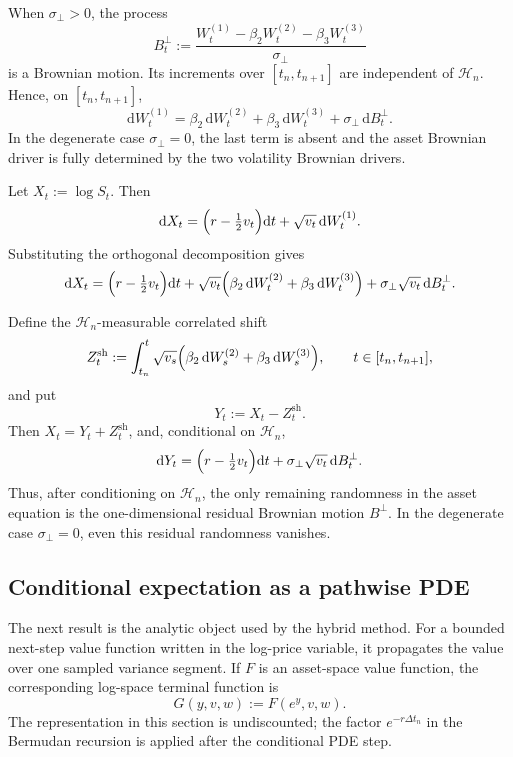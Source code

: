 \documentclass[pdflatex,sn-mathphys-num]{sn-jnl}
\theoremstyle{thmstyleone}%
\theoremstyle{thmstylethree}%
\theoremstyle{thmstyletwo}%
\newcommand{\dd}{\mathrm d}
\begin{document}
When $\sigma_\perp>0$, the process
\[
B_t^\perp
:=
\frac{W_t^{(1)}-\beta_2W_t^{(2)}-\beta_3W_t^{(3)}}{\sigma_\perp}
\]
is a Brownian motion. Its increments over $[t_n,t_{n+1}]$ are independent of
$\mathcal H_n$. Hence, on $[t_n,t_{n+1}]$,
\begin{equation}\label{eq:orth}
\dd W_t^{(1)}
=\beta_2\,\dd W_t^{(2)}
+\beta_3\,\dd W_t^{(3)}
+\sigma_\perp\,\dd B_t^\perp.
\end{equation}
In the degenerate case $\sigma_\perp=0$, the last term is absent and the asset
Brownian driver is fully determined by the two volatility Brownian drivers.

Let $X_t:=\log S_t$. Then
\begin{equation}\label{eq:logS}
\dd X_t
=\Bigl(r-\tfrac12v_t\Bigr)\dd t+\sqrt{v_t}\,\dd W_t^{(1)}.
\end{equation}
Substituting the orthogonal decomposition gives
\[
\dd X_t
=\Bigl(r-\tfrac12v_t\Bigr)\dd t
+\sqrt{v_t}\Bigl(\beta_2\,\dd W_t^{(2)}
+\beta_3\,\dd W_t^{(3)}\Bigr)
+\sigma_\perp\sqrt{v_t}\,\dd B_t^\perp.
\]

Define the $\mathcal H_n$-measurable correlated shift
\[
Z_t^{\mathrm{sh}}
:=
\int_{t_n}^t
\sqrt{v_s}
\Bigl(\beta_2\,\dd W_s^{(2)}+\beta_3\,\dd W_s^{(3)}\Bigr),
\qquad t\in[t_n,t_{n+1}],
\]
and put
\[
Y_t:=X_t-Z_t^{\mathrm{sh}}.
\]
Then $X_t=Y_t+Z_t^{\mathrm{sh}}$, and, conditional on $\mathcal H_n$,
\[
\dd Y_t
=\Bigl(r-\tfrac12v_t\Bigr)\dd t
+\sigma_\perp\sqrt{v_t}\,\dd B_t^\perp.
\]
Thus, after conditioning on $\mathcal H_n$, the only remaining randomness in
the asset equation is the one-dimensional residual Brownian motion $B^\perp$.
In the degenerate case $\sigma_\perp=0$, even this residual randomness vanishes.

\subsection{Conditional expectation as a pathwise PDE}

The next result is the analytic object used by the hybrid method. For a bounded
next-step value function written in the log-price variable, it propagates the
value over one sampled variance segment. If $F$ is an asset-space value
function, the corresponding log-space terminal function is
\[
G(y,v,w):=F(e^y,v,w).
\]
The representation in this section is undiscounted; the factor
$e^{-r\Delta t_n}$ in the Bermudan recursion is applied after the conditional
PDE step.
\end{document}
